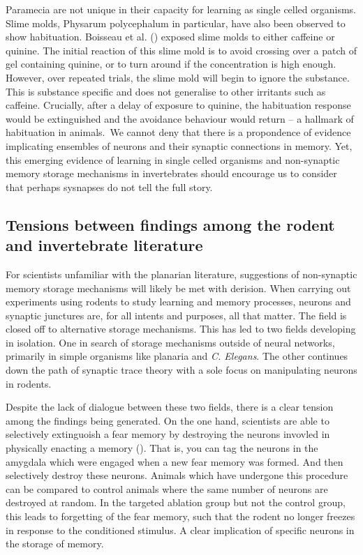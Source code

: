 \documentclass[
  jou,
  floatsintext,
  longtable,
  nolmodern,
  notxfonts,
  notimes,
  donotrepeattitle,
  colorlinks=true,linkcolor=blue,citecolor=blue,urlcolor=blue]{apa7}
\begin{document}
Paramecia are not unique in their capacity for learning as single celled
organisms. Slime molds, Physarum polycephalum in particular, have also
been observed to show habituation. Boisseau et al.
() exposed slime molds to
either caffeine or quinine. The initial reaction of this slime mold is
to avoid crossing over a patch of gel containing quinine, or to turn
around if the concentration is high enough. However, over repeated
trials, the slime mold will begin to ignore the substance. This is
substance specific and does not generalise to other irritants such as
caffeine. Crucially, after a delay of exposure to quinine, the
habituation response would be extinguished and the avoidance behaviour
would return -- a hallmark of habituation in animals.~We cannot deny
that there is a propondence of evidence implicating ensembles of neurons
and their synaptic connections in memory. Yet, this emerging evidence of
learning in single celled organisms and non-synaptic memory storage
mechanisms in invertebrates should encourage us to consider that perhaps
sysnapses do not tell the full story.

\subsection{Tensions between findings among the rodent and invertebrate
literature}\label{tensions-between-findings-among-the-rodent-and-invertebrate-literature}

For scientists unfamiliar with the planarian literature, suggestions of
non-synaptic memory storage mechanisms will likely be met with derision.
When carrying out experiments using rodents to study learning and memory
processes, neurons and synaptic junctures are, for all intents and
purposes, all that matter. The field is closed off to alternative
storage mechanisms. This has led to two fields developing in isolation.
One in search of storage mechanisms outside of neural networks,
primarily in simple organisms like planaria and \emph{C. Elegans}. The
other continues down the path of synaptic trace theory with a sole focus
on manipulating neurons in rodents.

Despite the lack of dialogue between these two fields, there is a clear
tension among the findings being generated. On the one hand, scientists
are able to selectively extinguoish a fear memory by destroying the
neurons invovled in physically enacting a memory
(). That is,
you can tag the neurons in the amygdala which were engaged when a new
fear memory was formed. And then selectively destroy these neurons.
Animals which have undergone this procedure can be compared to control
animals where the same number of neurons are destroyed at random. In the
targeted ablation group but not the control group, this leads to
forgetting of the fear memory, such that the rodent no longer freezes in
response to the conditioned stimulus. A clear implication of specific
neurons in the storage of memory.
\end{document}
